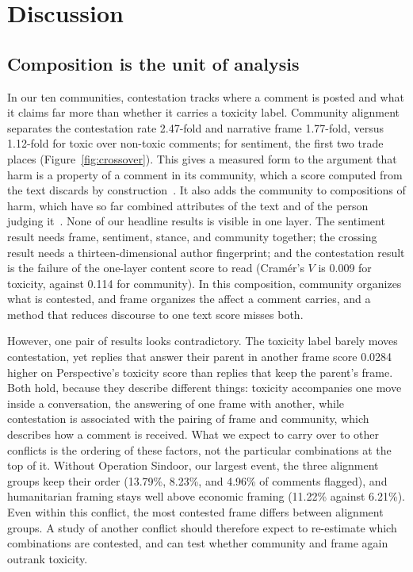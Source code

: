 \section{Discussion}

\subsection{Composition is the unit of analysis}

In our ten communities, contestation tracks where a comment is posted and what it claims far more than whether it carries a toxicity label. Community alignment separates the contestation rate 2.47-fold and narrative frame 1.77-fold, versus 1.12-fold for toxic over non-toxic comments; for sentiment, the first two trade places (Figure~\ref{fig:crossover}). This gives a measured form to the argument that harm is a property of a comment in its community, which a score computed from the text discards by construction~\cite{berezin2025contextualharm,hartmann2026byebye}. It also adds the community to compositions of harm, which have so far combined attributes of the text and of the person judging it~\cite{scheuerman2021severity,zhou2025harm}. None of our headline results is visible in one layer. The sentiment result needs frame, sentiment, stance, and community together; the crossing result needs a thirteen-dimensional author fingerprint; and the contestation result is the failure of the one-layer content score to read (Cram\'er's $V$ is 0.009 for toxicity, against 0.114 for community). In this composition, community organizes what is contested, and frame organizes the affect a comment carries, and a method that reduces discourse to one text score misses both.

However, one pair of results looks contradictory. The toxicity label barely moves contestation, yet replies that answer their parent in another frame score 0.0284 higher on Perspective's toxicity score than replies that keep the parent's frame. Both hold, because they describe different things: toxicity accompanies one move inside a conversation, the answering of one frame with another, while contestation is associated with the pairing of frame and community, which describes how a comment is received. What we expect to carry over to other conflicts is the ordering of these factors, not the particular combinations at the top of it. Without Operation Sindoor, our largest event, the three alignment groups keep their order (13.79\%, 8.23\%, and 4.96\% of comments flagged), and humanitarian framing stays well above economic framing (11.22\% against 6.21\%). Even within this conflict, the most contested frame differs between alignment groups. A study of another conflict should therefore expect to re-estimate which combinations are contested, and can test whether community and frame again outrank toxicity.

